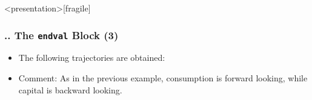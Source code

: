 \documentclass[11pt,aspectratio=169]{beamer}
\begin{document}
\begin{frame}<presentation>[fragile]
	\frametitle{{\thesection.\thesubsection.\thesubsubsection} The \texttt{endval} Block (3)}
		\begin{itemize}
		\item The following trajectories are obtained:
		\begin{figure}
			\centering
			\qquad
			\qquad
		\end{figure}
		\item Comment: As in the previous example, consumption is forward looking, while capital is backward looking.
	\end{itemize}
\end{frame}
\end{document}
